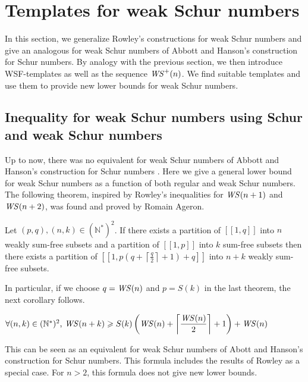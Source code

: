 \section{Templates for weak Schur numbers}
\label{WeakSchur}

\qquad In this section, we generalize Rowley's constructions for weak Schur numbers \cite{RowleyWS} and give an analogous
for weak Schur numbers of Abbott and Hanson's construction for Schur numbers. By analogy with the previous section,
we then introduce WSF-templates as well as the sequence \(\mathit{WS}^+(n)\). We find suitable templates and use them to
provide new lower bounds for weak Schur numbers.

\subsection{Inequality for weak Schur numbers using Schur and weak Schur numbers}

\qquad Up to now, there was no equivalent for weak Schur numbers of Abbott and Hanson's construction for Schur numbers
\cite{AbbottHanson}. Here we give a general lower bound for weak Schur numbers as a function of both regular and
weak Schur numbers. The following theorem, inspired by Rowley's inequalities for \(\mathit{WS} (n+1)\) and \(\mathit{WS} (n+2)\),
was found and proved by Romain Ageron.

\begin{theorem}
\label{theorem}
Let \((p,q), (n,k) \in (\mathbb{N}^*)^2\). If there exists a partition of \([\![1,q]\!]\) into \(n\) weakly sum-free
subsets and a partition of \([\![1,p]\!]\) into \(k\) sum-free
subsets then there exists a partition of \([\![1,p(q+\left \lceil \frac{q}{2} \right \rceil + 1)+q]\!]\) into \(n+k\)
weakly sum-free subsets.
\end{theorem}

In particular, if we choose \(q = \mathit{WS} (n)\) and \(p = S(k)\) in the last theorem, the next corollary follows.

\begin{corollary}
\( \forall (n,k) \in (\mathbb{N}^*)^2 \text{, } \mathit{WS} (n+k) \geqslant S(k) \left (\mathit{WS} (n) + \left \lceil \displaystyle \frac{\mathit{WS} (n)}{2}
\right \rceil +1 \right) + \mathit{WS} (n)\)
\end{corollary}

This can be seen as an equivalent for weak Schur numbers of Abott and Hanson's construction for Schur numbers. This formula includes
the results of Rowley \cite{RowleyWS} as a special case. For \(n>2\), this formula does not give new lower bounds.

